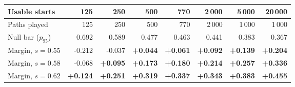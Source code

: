 \begin{tabular}{lrrrrrrr}
\toprule
Usable starts & 125 & 250 & 500 & 770 & 2\,000 & 5\,000 & 20\,000 \\
\midrule
Paths played & 125 & 250 & 500 & 770 & 2\,000 & 1\,000 & 1\,000 \\
Null bar ($p_{95}$) & 0.692 & 0.589 & 0.477 & 0.463 & 0.441 & 0.383 & 0.367 \\
\midrule
Margin, $s=0.55$ & -0.212 & -0.037 & \textbf{+0.044} & \textbf{+0.061} & \textbf{+0.092} & \textbf{+0.139} & \textbf{+0.204} \\
Margin, $s=0.58$ & -0.068 & \textbf{+0.095} & \textbf{+0.173} & \textbf{+0.180} & \textbf{+0.214} & \textbf{+0.257} & \textbf{+0.336} \\
Margin, $s=0.62$ & \textbf{+0.124} & \textbf{+0.251} & \textbf{+0.319} & \textbf{+0.337} & \textbf{+0.343} & \textbf{+0.383} & \textbf{+0.455} \\
\bottomrule
\end{tabular}
